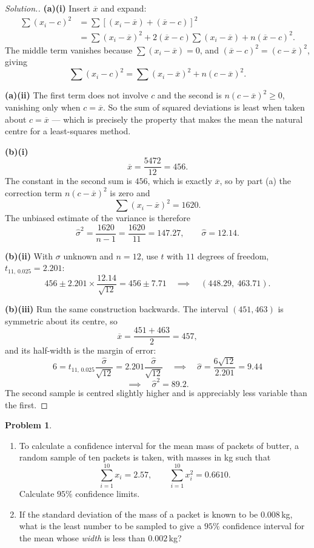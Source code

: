 \documentclass[11pt,a4paper]{article}
\theoremstyle{definition}
\newtheorem{problemx}{Problem}[section]
\newenvironment{problem}{\begin{problemx}}{\end{problemx}}
\newenvironment{solution}
  {\renewcommand{\qedsymbol}{}\begin{proof}[\textit{Solution}.]}
  {\end{proof}}
\begin{document}
\begin{solution}
\textbf{(a)(i)} Insert $\overline{x}$ and expand:
\begin{align*}
\sum(x_i-c)^2 &=\sum\left[(x_i-\overline{x})+(\overline{x}-c)\right]^2\\
&=\sum(x_i-\overline{x})^2+2(\overline{x}-c)\sum(x_i-\overline{x})+n(\overline{x}-c)^2.
\end{align*}
The middle term vanishes because $\sum(x_i-\overline{x})=0$, and $(\overline{x}-c)^2=(c-\overline{x})^2$, giving
\[\sum(x_i-c)^2=\sum(x_i-\overline{x})^2+n(c-\overline{x})^2.\]

\textbf{(a)(ii)} The first term does not involve $c$ and the second is $n(c-\overline{x})^2\geq 0$,
vanishing only when $c=\overline{x}$. So the sum of squared deviations is least when taken
about $\boxed{c=\overline{x}}$ --- which is precisely the property that makes the mean the
natural centre for a least-squares method.

\textbf{(b)(i)}
\[\overline{x}=\frac{5472}{12}=456.\]
The constant in the second sum is $456$, which is exactly $\overline{x}$, so by part (a) the
correction term $n(c-\overline{x})^2$ is zero and
\[\sum(x_i-\overline{x})^2=1620.\]
The unbiased estimate of the variance is therefore
\[\widehat{\sigma}^2=\frac{1620}{n-1}=\frac{1620}{11}=147.27,\qquad \widehat{\sigma}=12.14.\]

\textbf{(b)(ii)} With $\sigma$ unknown and $n=12$, use $t$ with $11$ degrees of freedom,
$t_{11,\,0.025}=2.201$:
\[456\pm 2.201\times\frac{12.14}{\sqrt{12}}=456\pm 7.71
\quad\implies\quad (448.29,\ 463.71).\]

\textbf{(b)(iii)} Run the same construction backwards. The interval $(451,463)$ is symmetric
about its centre, so
\[\overline{x}=\frac{451+463}{2}=457,\]
and its half-width is the margin of error:
\[6=t_{11,\,0.025}\frac{\widehat{\sigma}}{\sqrt{12}}=2.201\frac{\widehat{\sigma}}{\sqrt{12}}
\quad\implies\quad \widehat{\sigma}=\frac{6\sqrt{12}}{2.201}=9.44\]
\[\implies\quad \widehat{\sigma}^2=89.2.\]
The second sample is centred slightly higher and is appreciably less variable than the first.
\end{solution}

\begin{problem}
\begin{enumerate}
\item[(a).] To calculate a confidence interval for the mean mass of packets of butter, a
random sample of ten packets is taken, with masses in kg such that
\[\sum_{i=1}^{10}x_i=2.57,\qquad \sum_{i=1}^{10}x_i^2=0.6610.\]
Calculate $95\%$ confidence limits.
\item[(b).] If the standard deviation of the mass of a packet is known to be $0.008$\,kg,
what is the least number to be sampled to give a $95\%$ confidence interval for the mean
whose \emph{width} is less than $0.002$\,kg?
\end{enumerate}
\end{problem}
\end{document}
